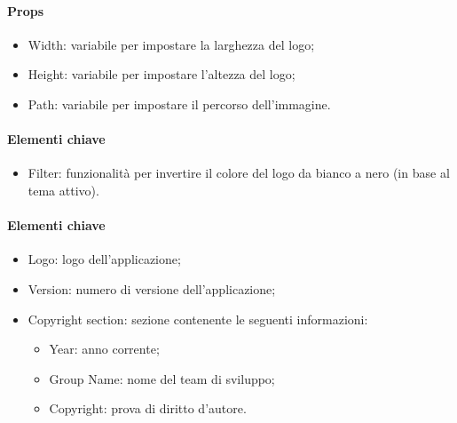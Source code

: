 
\paragraph*{Props}
\begin{itemize}
  \item Width: variabile per impostare la larghezza del logo;
  \item Height: variabile per impostare l'altezza del logo;
  \item Path: variabile per impostare il percorso dell'immagine.
\end{itemize}

\paragraph*{Elementi chiave}
\begin{itemize}
  \item Filter: funzionalità per invertire il colore del logo da bianco a nero (in base al tema attivo).
\end{itemize}


\paragraph*{Elementi chiave}
\begin{itemize}
  \item Logo: logo dell'applicazione;
  \item Version: numero di versione dell'applicazione;
  \item Copyright section: sezione contenente le seguenti informazioni:
  \begin{itemize}
    \item Year: anno corrente;
    \item Group Name: nome del team di sviluppo;
    \item Copyright: prova di diritto d'autore.
  \end{itemize}
\end{itemize}